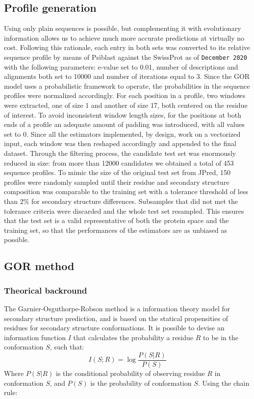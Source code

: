 \documentclass[nocrop]{bioinfo}
\begin{document}
\begin{methods}
\subsection{Profile generation}
Using only plain sequences is possible, but complementing it with evolutionary information allows us to achieve much more accurate predictions at virtually no cost.
Following this rationale, each entry in both sets was converted to its relative sequence profile by means of Psiblast \citep{Altschul1997} against the SwissProt as of \texttt{December 2020} \citep{2018a} with the following parameters: e-value set to 0.01, number of descriptions and alignments both set to 10000 and number of iterations equal to 3.
Since the GOR model uses a probabilistic framework to operate, the probabilities in the sequence profiles were normalized accordingly.
For each position in a profile, two windows were extracted, one of size 1 and another of size 17, both centered on the residue of interest.
To avoid inconsistent window length sizes, for the positions at both ends of a profile an adequate amount of padding was introduced, with all values set to 0.
Since all the estimators implemented, by design, work on a vectorized input, each window was then reshaped accordingly and appended to the final dataset.
Through the filtering process, the candidate test set was enormously reduced in size: from more than 12000 candidates we obtained a total of 453 sequence profiles.
To mimic the size of the original test set from JPred, 150 profiles were randomly sampled until their residue and secondary structure composition was comparable to the training set with a tolerance threshold of less than 2\% for secondary structure differences.
Subsamples that did not met the tolerance criteria were discarded and the whole test set resampled.
This ensures that the test set is a valid representative of both the protein space and the training set, so that the performances of the estimators are as unbiased as possible.
\subsection{GOR method}
\subsubsection*{Theorical backround}

The Garnier-Osguthorpe-Robson \citep{Garnier1978} method is a information theory model for secondary structure prediction, and is based on the statical propensities of residues for secondary structure conformations. 
It is possible to devise an information function $I$ that calculates the probability a residue $R$ to be in the conformation $S$, such that:
\begin{equation}
	I(S;R)=\log\frac{P(S|R)}{P(S)}
\end{equation}
Where $P(S|R)$ is the conditional probability of observing residue $R$ in conformation $S$, and $P(S)$ is the probability of conformation $S$.
Using the chain rule:


\end{methods}
\end{document}
